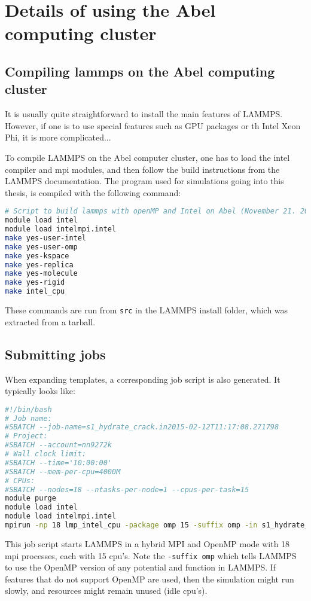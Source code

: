 \chapter{Details of using the Abel computing cluster}

\section{Compiling lammps on the Abel computing cluster}
It is usually quite straightforward to install the main features of LAMMPS. However, if one is to use special features such as GPU packages or th Intel Xeon Phi, it is more complicated... 	

To compile LAMMPS on the Abel computer cluster, one has to load the intel compiler and mpi modules, and then follow the build instructions from the LAMMPS documentation. The program used for simulations going into this thesis, is compiled with the following command:
\begin{lstlisting}[language=Bash]
# Script to build lammps with openMP and Intel on Abel (November 21. 2014)
module load intel
module load intelmpi.intel
make yes-user-intel
make yes-user-omp
make yes-kspace
make yes-replica
make yes-molecule
make yes-rigid
make intel_cpu
\end{lstlisting}
These commands are run from {\tt src} in the LAMMPS install folder, which was extracted from a tarball.

\section{Submitting jobs}
When expanding templates, a corresponding job script is also generated. It typically looks like:
\begin{lstlisting}[language=Bash]
#!/bin/bash
# Job name:
#SBATCH --job-name=s1_hydrate_crack.in2015-02-12T11:17:08.271798
# Project: 
#SBATCH --account=nn9272k
# Wall clock limit:
#SBATCH --time='10:00:00'
#SBATCH --mem-per-cpu=4000M
# CPUs:
#SBATCH --nodes=18 --ntasks-per-node=1 --cpus-per-task=15
module purge
module load intel
module load intelmpi.intel
mpirun -np 18 lmp_intel_cpu -package omp 15 -suffix omp -in s1_hydrate_crack.in
\end{lstlisting}

This job script starts LAMMPS in a hybrid MPI and OpenMP mode with 18 mpi processes, each with 15 cpu's. Note the {\tt -suffix omp} which tells LAMMPS to use the OpenMP version of any potential and function in LAMMPS. If features that do not support OpenMP are used, then the simulation might run slowly, and resources might remain unused (idle cpu's).

